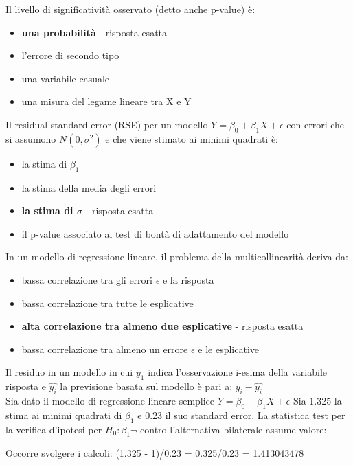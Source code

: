 Il livello di significatività osservato (detto anche p-value) è:

\begin{itemize}
\item \textbf{una probabilità} - risposta esatta
\item l'errore di secondo tipo
\item una variabile casuale
\item una misura del legame lineare tra X e Y
\end{itemize}

Il residual standard error (RSE) per un modello $Y = \beta_0 + \beta_1X + \epsilon$
con errori che si assumono $N(0,\sigma^2)$ e che viene stimato ai minimi quadrati è:

\begin{itemize}
\item la stima di $\beta_1$
\item la stima della media degli errori
\item \textbf{la stima di $\sigma$} - risposta esatta
\item il p-value associato al test di bontà di adattamento del modello
\end{itemize}

In un modello di regressione lineare, il problema della multicollinearità deriva da:

\begin{itemize}
\item bassa correlazione tra gli errori $\epsilon$ e la risposta
\item bassa correlazione tra tutte le esplicative
\item \textbf{alta correlazione tra almeno due esplicative} - risposta esatta
\item bassa correlazione tra almeno un errore $\epsilon$ e le esplicative
\end{itemize}

Il residuo in un modello in cui $y_1$ indica l’osservazione i-esima della variabile
risposta e $\hat{y_i}$ la previsione basata sul modello è pari a: $y_i - \hat{y_i}$\\

Sia dato il modello di regressione lineare semplice $Y = \beta_0 + \beta_1X + \epsilon$
Sia 1.325 la stima ai minimi quadrati di $\beta_1$ e 0.23 il suo standard error. 
La statistica test per la verifica d'ipotesi per $H_0 : \beta_1 \neg$ contro
l'alternativa bilaterale assume valore:

Occorre svolgere i calcoli: (1.325 - 1)/0.23 = 0.325/0.23 = 1.413043478\\

